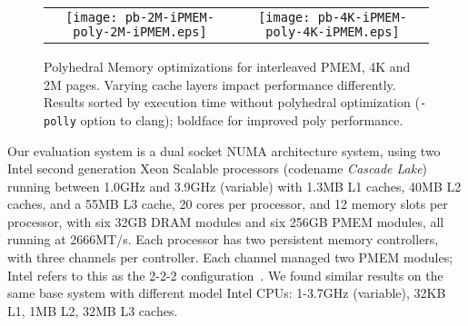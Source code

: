 
\begin{figure*}[!th]
  \captionsetup{justification=centering}
  \centering
  \caption{Polyhedral Memory optimizations for interleaved PMEM, 4K and 2M pages.  Varying cache layers impact performance differently. Results sorted by execution time without polyhedral optimization (\texttt{-polly} option to clang); boldface for improved poly performance.}
  \vspace{0.1cm}
  \label{fig:polybench:all:time}
  \begin{tabular}{cc}
    \texttt{[image: pb-2M-iPMEM-poly-2M-iPMEM.eps]} &
    \texttt{[image: pb-4K-iPMEM-poly-4K-iPMEM.eps]}
  \end{tabular}
\end{figure*}


%
%
%
%


Our evaluation system is a dual socket NUMA architecture system, using two Intel\textsuperscript{\textregistered} second generation Xeon\textsuperscript{\textregistered} Scalable processors (codename \textit{Cascade Lake}) running between 1.0GHz and 3.9GHz (variable) with 1.3MB L1 caches, 40MB L2 caches, and a 55MB L3 cache, 20 cores per processor, and 12 memory slots per processor, with six 32GB DRAM modules and six 256GB PMEM modules, all running at 2666MT/s. Each processor has two persistent memory controllers, with three channels per controller.  Each channel managed two PMEM modules; Intel refers to this as the 2-2-2 configuration~\cite{intel2019quickstart}. We found similar results on the same base system with different model Intel CPUs: 1-3.7GHz (variable), 32KB L1, 1MB L2, 32MB L3 caches.


